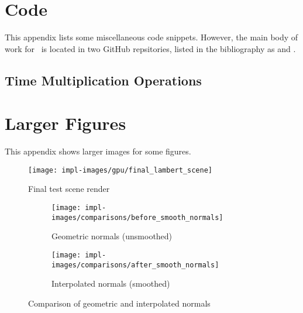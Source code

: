 %
%

\chapter{Code}\label{appendix:code}
This appendix lists some miscellaneous code snippets.
However, the main body of work for \name\ is located in two GitHub repsitories, listed in the bibliography as \cite{raytermCpuImpl} and \cite{raytermGpuImpl}.


\section{Time Multiplication Operations}\label{appendix:timemul}


\chapter{Larger Figures}\label{appendix:large_figures}
This appendix shows larger images for some figures.

\vspace{0.3em}
\begin{figure}[htb]
  \centering
  \texttt{[image: impl-images/gpu/final\_lambert\_scene]}
  \caption{Final test scene render}
\label{fig:rayterm-gpu_final_render_large}
\end{figure}

\vspace{0.3em}
\begin{figure}[htb]
  \centering
  \begin{subfigure}[htb]{\textwidth}
    \texttt{[image: impl-images/comparisons/before\_smooth\_normals]}
    \caption{Geometric normals (unsmoothed)}
\label{fig:rayterm-gpu_unsmoothed_normals_large}
  \end{subfigure}
  \begin{subfigure}[htb]{\textwidth}
    \texttt{[image: impl-images/comparisons/after\_smooth\_normals]}
    \caption{Interpolated normals (smoothed)}
\label{fig:rayterm-gpu_smoothed_normals_large}
  \end{subfigure}
  \caption{Comparison of geometric and interpolated normals}
\label{fig:rayterm-gpu_smooth_normal_comparison_large}
\end{figure}

